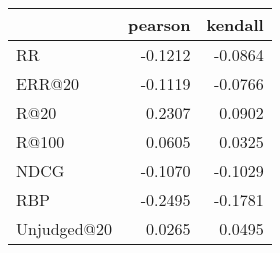 \begin{tabular}{lrr}
\toprule
{} &  pearson &  kendall \\
\midrule
RR          &  -0.1212 &  -0.0864 \\
ERR@20      &  -0.1119 &  -0.0766 \\
R@20        &   0.2307 &   0.0902 \\
R@100       &   0.0605 &   0.0325 \\
NDCG        &  -0.1070 &  -0.1029 \\
RBP         &  -0.2495 &  -0.1781 \\
Unjudged@20 &   0.0265 &   0.0495 \\
\bottomrule
\end{tabular}
